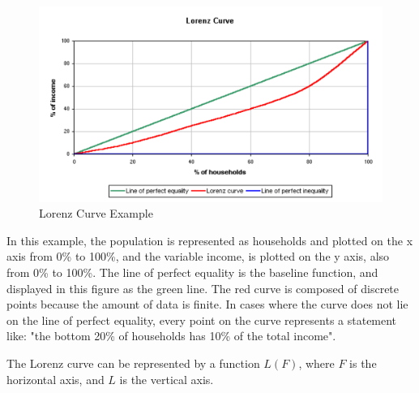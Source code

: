 \documentclass{howto}
\begin{document}
\begin{figure}
\begin{center}
\includegraphics[width=150mm]{images/Lorenz.pdf}
\caption{Lorenz Curve Example}
\end{center}
\end{figure}

In this example, the population is represented as households and plotted on the x axis from 0\% to 100\%, and the variable income, is plotted on the y axis, also from 0\% to 100\%.  The line of perfect equality is the baseline function, and displayed in this figure as the green line.  The red curve is composed of discrete points because the amount of data is finite. In cases where the curve does not lie on the line of perfect equality, every point on the curve represents a 
statement like: "the bottom 20\% of households has 10\% of the total income".

The Lorenz curve can be represented by a function $L(F)$, where $F$ is the horizontal axis, 
and $L$ is the vertical axis.
\end{document}
